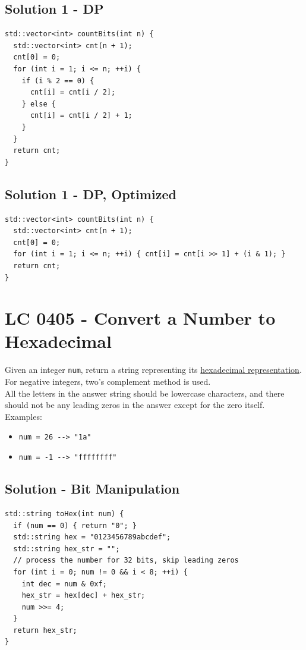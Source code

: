 \subsection*{Solution 1 - DP}
\begin{lstlisting}
std::vector<int> countBits(int n) {
  std::vector<int> cnt(n + 1);
  cnt[0] = 0;
  for (int i = 1; i <= n; ++i) {
    if (i % 2 == 0) {
      cnt[i] = cnt[i / 2];
    } else {
      cnt[i] = cnt[i / 2] + 1;
    }
  }
  return cnt;
}
\end{lstlisting}

\subsection*{Solution 1 - DP, Optimized}
\begin{lstlisting}
std::vector<int> countBits(int n) {
  std::vector<int> cnt(n + 1);
  cnt[0] = 0;
  for (int i = 1; i <= n; ++i) { cnt[i] = cnt[i >> 1] + (i & 1); }
  return cnt;
}
\end{lstlisting}

\section{LC 0405 - Convert a Number to Hexadecimal}\label{lc0405}
Given an integer {\colorbox{CodeBackground}{\lstinline|num|}}, return a string representing its \ul{hexadecimal representation}. For negative integers, two’s complement method is used.\\

All the letters in the answer string should be lowercase characters, and there should not be any leading zeros in the answer except for the zero itself.\\

Examples:
\begin{itemize}
\item {\colorbox{CodeBackground}{\lstinline|num = 26 --> "1a"|}}
\item {\colorbox{CodeBackground}{\lstinline|num = -1 --> "ffffffff"|}}
\end{itemize}

\subsection*{Solution - Bit Manipulation}
\begin{lstlisting}
std::string toHex(int num) {
  if (num == 0) { return "0"; }
  std::string hex = "0123456789abcdef";
  std::string hex_str = "";
  // process the number for 32 bits, skip leading zeros
  for (int i = 0; num != 0 && i < 8; ++i) {
    int dec = num & 0xf;
    hex_str = hex[dec] + hex_str;
    num >>= 4;
  }
  return hex_str;
}
\end{lstlisting}

